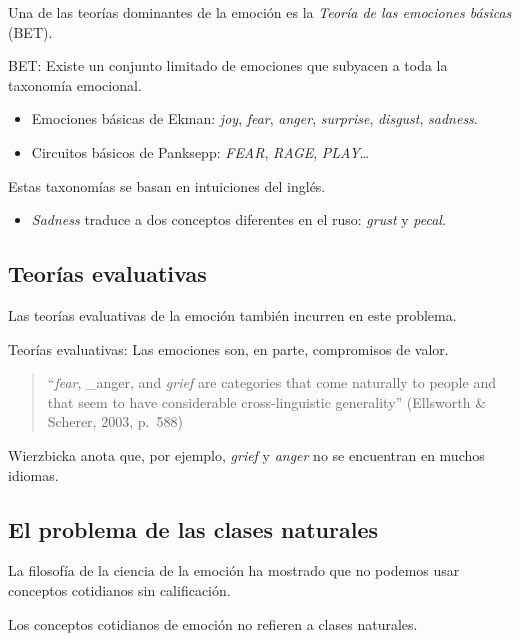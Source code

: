 \documentclass{article}
\providecommand{\tightlist}{%
  \setlength{\itemsep}{0pt}\setlength{\parskip}{0pt}}
\begin{document}
Una de las teorías dominantes de la emoción es la \emph{Teoría de las
emociones básicas} (BET).

BET: Existe un conjunto limitado de emociones que subyacen a toda la
taxonomía emocional.

\begin{itemize}
\tightlist
\item
  Emociones básicas de Ekman: \emph{joy}, \emph{fear}, \emph{anger},
  \emph{surprise}, \emph{disgust}, \emph{sadness}.
\item
  Circuitos básicos de Panksepp: \emph{FEAR}, \emph{RAGE},
  \emph{PLAY}\ldots{}
\end{itemize}

Estas taxonomías se basan en intuiciones del inglés.

\begin{itemize}
\tightlist
\item
  \emph{Sadness} traduce a dos conceptos diferentes en el ruso:
  \emph{grust} y \emph{pecal}.
\end{itemize}

\subsection{Teorías evaluativas}\label{teoruxedas-evaluativas}

Las teorías evaluativas de la emoción también incurren en este problema.

Teorías evaluativas: Las emociones son, en parte, compromisos de valor.

\begin{quote}
``\emph{fear}, \_anger, and \emph{grief} are categories that come
naturally to people and that seem to have considerable cross-linguistic
generality'' (Ellsworth \& Scherer, 2003, p.~588)
\end{quote}

Wierzbicka anota que, por ejemplo, \emph{grief} y \emph{anger} no se
encuentran en muchos idiomas.

\subsection{El problema de las clases
naturales}\label{el-problema-de-las-clases-naturales}

La filosofía de la ciencia de la emoción ha mostrado que no podemos usar
conceptos cotidianos sin calificación.

Los conceptos cotidianos de emoción no refieren a clases naturales.
\end{document}
